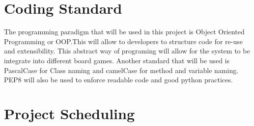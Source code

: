 \documentclass{article}
\begin{document}
\section{Coding Standard}
The programming paradigm that will be used in this project is Object Oriented Programming or OOP.This will allow to developers to structure code
for re-use and extensibility. This abstract way of programing will allow for the system to be integrate into different board games. Another standard that
will be used is PascalCase for Class naming and camelCase for method and variable naming. PEP8 will also be used to enforce readable code and good python practices.

\section{Project Scheduling}


\end{document}
